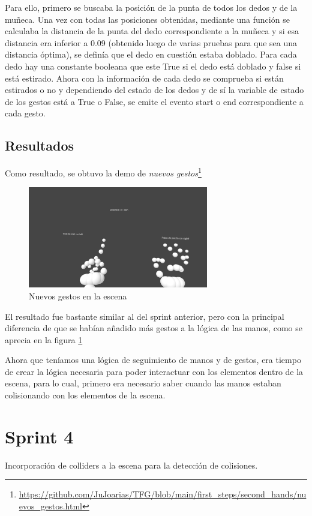 \documentclass[a4paper, 12pt]{book}
\begin{document}
Para ello, primero se buscaba la posición de la punta de todos los dedos y de la muñeca. Una vez con todas las posiciones obtenidas, mediante una función se calculaba la distancia de la punta del dedo correspondiente a la muñeca y si esa distancia era inferior a 0.09 (obtenido luego de varias pruebas para que sea una distancia óptima), se definía que el dedo en cuestión estaba doblado.
Para cada dedo hay una constante booleana que este True si el dedo está doblado y false si está estirado. Ahora con la información de cada dedo se comprueba si están estirados o no y dependiendo del estado de los dedos y de sí la variable de estado de los gestos está a True o False, se emite el evento start o end correspondiente a cada gesto. 

\subsection{Resultados}
\label{subsec:resultados3}
Como resultado, se obtuvo la demo de \textit{nuevos gestos}\footnote{\url{https://github.com/JuJoarias/TFG/blob/main/first_steps/second_hands/nuevos_gestos.html}}

\begin{figure}[H] 
  \centering
  \includegraphics[width=0.7\textwidth]{img/nuevos_gestos.jpg} 
  \caption{Nuevos gestos en la escena}
  \label{fig:sprint3}
\end{figure}

El resultado fue bastante similar al del sprint anterior, pero con la principal diferencia de que se habían añadido más gestos a la lógica de las manos, como se aprecia en la figura \ref{fig:sprint3}

Ahora que teníamos una lógica de seguimiento de manos y de gestos, era tiempo de crear la lógica necesaria para poder interactuar con los elementos dentro de la escena, para lo cual, primero era necesario saber cuando las manos estaban colisionando con los elementos de la escena. 
\section{Sprint 4}
\label{sec:sprint4}
Incorporación de colliders a la escena para la detección de colisiones.
\end{document}
